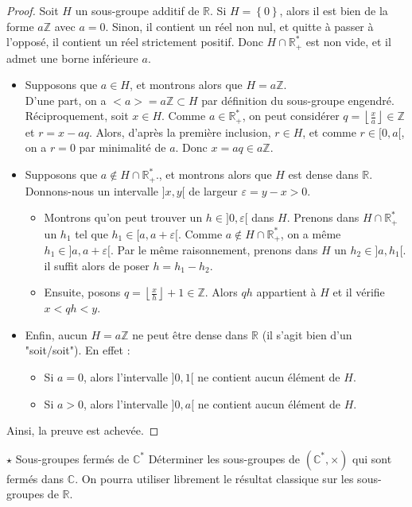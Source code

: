 \documentclass[french,a4paper]{article}
\newcommand{\Z}{\mathbb{Z}}
\newcommand{\R}{\mathbb{R}}
\newcommand{\C}{\mathbb{C}}
\newcommand{\st}{^*}
\theoremstyle{plain}
\theoremstyle{definition}
\theoremstyle{remark}
\begin{document}
\begin{proof}
	Soit $H$ un sous-groupe additif de $\R$. Si $H=\left\{0\right\}$, alors il est bien de la forme $a\Z$ avec $a=0$. Sinon, il contient un réel non nul, et quitte à passer à l'opposé, il contient un réel strictement positif. Donc $H\cap\R_+\st$ est non vide, et il admet une borne inférieure $a$.
	\begin{itemize}
		\item Supposons que $a\in H$, et montrons alors que $H=a\Z$. \\ D'une part, on a $<a>=a\Z\subset H$ par définition du sous-groupe engendré. Réciproquement, soit $x\in H$. Comme $a\in\R_+\st$, on peut considérer $q=\displaystyle\left\lfloor\frac{x}{a}\right\rfloor\in\Z$ et $r=x-aq$. Alors, d'après la première inclusion, $r\in H$, et comme $r\in[0,a[$, on a $r=0$ par minimalité de $a$. Donc $x=aq\in a\Z$.
		\item Supposons que $a\notin H\cap\R_+\st$., et montrons alors que $H$ est dense dans $\R$. \\ Donnons-nous un intervalle $]x,y[$ de largeur $\varepsilon=y-x>0$.
		\begin{itemize}
			\item Montrons qu'on peut trouver un $h\in]0,\varepsilon[$ dans $H$. Prenons dans $H\cap\R_+\st$ un $h_1$ tel que $h_1\in[a,a+\varepsilon[$. Comme $a\notin H\cap\R_+\st$, on a même $h_1\in]a,a+\varepsilon[$. Par le même raisonnement, prenons dans $H$ un $h_2\in]a,h_1[$. il suffit alors de poser $h=h_1-h_2$.
			\item Ensuite, posons $q=\displaystyle\left\lfloor\frac{x}{h}\right\rfloor+1\in\Z$. Alors $qh$ appartient à $H$ et il vérifie $x<qh<y$.
		\end{itemize}
		\item Enfin, aucun $H=a\Z$ ne peut être dense dans $\R$ (il s'agit bien d'un "soit/soit"). En effet :
		\begin{itemize}
			\item Si $a=0$, alors l'intervalle $]0,1[$ ne contient aucun élément de $H$.
			\item Si $a>0$, alors l'intervalle $]0,a[$ ne contient aucun élément de $H$.
		\end{itemize}
	\end{itemize}
	Ainsi, la preuve est achevée.
\end{proof}

\begin{ex}[Moulin.10]{$\star$ Sous-groupes fermés de $\C\st$}
	Déterminer les sous-groupes de $(\C\st,\times)$ qui sont fermés dans $\C$. On pourra utiliser librement le résultat classique sur les sous-groupes de $\R$.
\end{ex}
\end{document}
